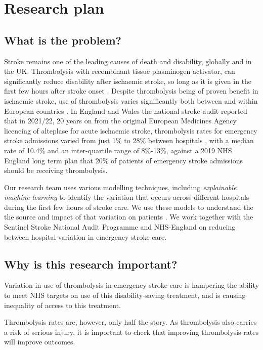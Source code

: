 \section{Research plan}

\subsection{What is the problem?}

Stroke remains one of the leading causes of death and disability, globally and in the UK. Thrombolysis with recombinant tissue plasminogen activator, can significantly reduce disability after ischaemic stroke, so long as it is given in the first few hours after stroke onset \cite{emberson_effect_2014}. Despite thrombolysis being of proven benefit in ischaemic stroke, use of thrombolysis varies significantly both between and within European countries \cite{aguiar_de_sousa_access_2019}. In England and Wales the national stroke audit reported that in 2021/22, 20 years on from the original European Medicines Agency licencing of alteplase for acute ischaemic stroke, thrombolysis rates for emergency stroke admissions varied from just 1\% to 28\% between hospitals \cite{sentinel_national_stroke_audit_programme_ssnap_2022}, with a median rate of 10.4\% and an inter-quartile range of 8\%-13\%, against a 2019 NHS England long term plan that 20\% of patients of emergency stroke admissions should be receiving thrombolysis.

Our research team uses various modelling techniques, including \textit{explainable machine learning} to identify the variation that occurs across different hospitals during the first few hours of stroke care. We use these models to understand the the source and impact of that variation on patients \cite{allen_using_2022, allen_use_2022}. We work together with the Sentinel Stroke National Audit Programme and NHS-England on reducing between hospital-variation in emergency stroke care. 

\subsection{Why is this research important?}

Variation in use of thrombolysis in emergency stroke care is hampering the ability to meet NHS targets on use of this disability-saving treatment, and is causing inequality of access to this treatment. 

Thrombolysis rates are, however, only half the story. As thrombolysis also carries a risk of serious injury, it is important to check that improving thrombolysis rates will improve outcomes.

